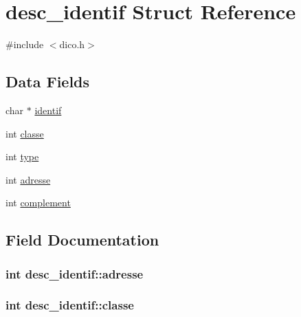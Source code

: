 \hypertarget{structdesc__identif}{}\section{desc\+\_\+identif Struct Reference}
\label{structdesc__identif}


{\ttfamily \#include $<$dico.\+h$>$}

\subsection*{Data Fields}
\begin{DoxyCompactItemize}
\item 
char $\ast$ \hyperlink{structdesc__identif_a6239e167bc752c6bf15d9e494ca415c3}{identif}
\item 
int \hyperlink{structdesc__identif_a2f2fc080f14e9b63fdfcae3b99624313}{classe}
\item 
int \hyperlink{structdesc__identif_a80c4c518d38eb63511383eef8241ffe2}{type}
\item 
int \hyperlink{structdesc__identif_a2fec08eff357beeb90ea55d151a8744f}{adresse}
\item 
int \hyperlink{structdesc__identif_a6db63bc659a03181e2fa928c5d350d7e}{complement}
\end{DoxyCompactItemize}


\subsection{Field Documentation}
\subsubsection[{\texorpdfstring{adresse}{adresse}}]{\setlength{\rightskip}{0pt plus 5cm}int desc\+\_\+identif\+::adresse}\hypertarget{structdesc__identif_a2fec08eff357beeb90ea55d151a8744f}{}\label{structdesc__identif_a2fec08eff357beeb90ea55d151a8744f}
\subsubsection[{\texorpdfstring{classe}{classe}}]{\setlength{\rightskip}{0pt plus 5cm}int desc\+\_\+identif\+::classe}\hypertarget{structdesc__identif_a2f2fc080f14e9b63fdfcae3b99624313}{}\label{structdesc__identif_a2f2fc080f14e9b63fdfcae3b99624313}

